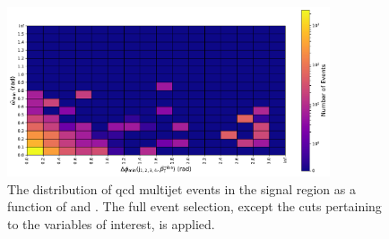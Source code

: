 \begin{figure}[htbp]
    \centering
    \includegraphics[width=0.85\textwidth]{figures/category_optimisations/omega_vs_dphi.pdf}
    \caption[The distribution of QCD multijet events in the signal region as a function of \omegaTilde and \mindphi]{The distribution of \acrshort{qcd} multijet events in the signal region as a function of \omegaTilde and \mindphi. The full event selection, except the cuts pertaining to the variables of interest, is applied.}
    \label{fig:htoinv_omega_vs_dphi_qcd_SR}
\end{figure}

